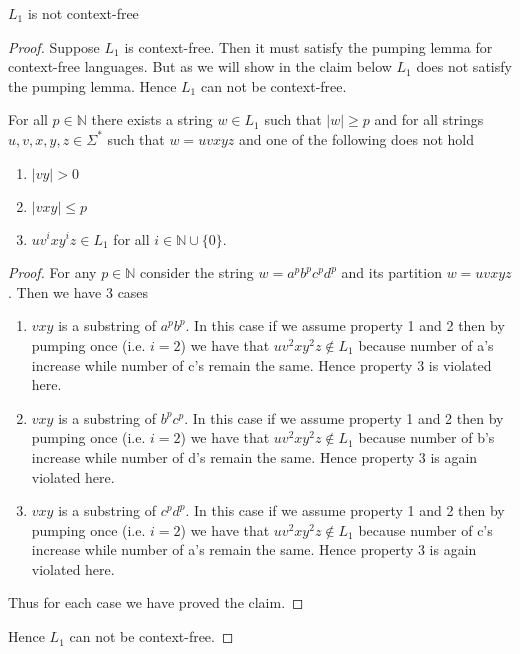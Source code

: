 \begin{soln}
\begin{claim}
$L_1$ is not context-free
\end{claim}
\begin{proof}
Suppose $L_1$ is context-free. Then it must satisfy the pumping lemma for context-free languages.
But as we will show in the claim below $L_1$ does not satisfy the pumping lemma. Hence $L_1$ can
not be context-free.
\begin{claim}
For all $p \in \mathbb{N}$ there exists a string $w \in L_1$ such that $|w| \geq p$ and
for all strings $u, v, x, y, z \in \Sigma^*$ such that $w = uvxyz$  and one of the following does 
not hold
\begin{enumerate}
    \item  $|vy| > 0$
    \item $|vxy| \leq p$
    \item  $uv^ixy^iz \in L_1$ for all $i \in \mathbb{N} \cup \{0\}$.
\end{enumerate}
\end{claim}
\begin{proof}
For any $p \in \mathbb{N}$ consider the string $w = a^p b^p c^p d^p$ and its partition $w = uvxyz$.
Then we have 3 cases
\begin{enumerate}
    \item $vxy$ is a substring of $a^p b^p$. In this case if we assume property 1 and 2 then by pumping once (i.e. $i=2$)
    we have that $uv^2xy^2z \notin L_1$ because number of a's increase while number of c's remain the same.
    Hence property 3 is violated here.
    
    \item $vxy$ is a substring of $b^p c^p$. In this case if we assume property 1 and 2 then by pumping once (i.e. $i=2$)
    we have that $uv^2xy^2z \notin L_1$ because number of b's increase while number of d's remain the same.
    Hence property 3 is again violated here.
     
    \item $vxy$ is a substring of $c^p d^p$. In this case if we assume property 1 and 2 then by pumping once (i.e. $i=2$)
    we have that $uv^2xy^2z \notin L_1$ because number of c's increase while number of a's remain the same.
    Hence property 3 is again violated here.
\end{enumerate}
Thus for each case we have proved the claim.
\end{proof}
Hence $L_1$ can not be context-free.
\end{proof}


\end{soln}
